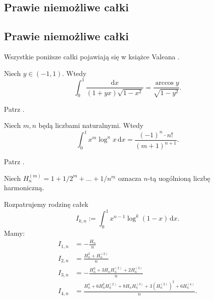 \subsection{Prawie niemożliwe całki}
\subsection{Prawie niemożliwe całki} %
Wszystkie poniższe całki pojawiają się w książce Valeana \cite{valean19}.

\begin{problem}
    \label{valean_grundpreis}%
    Niech $y \in (-1, 1)$.
    Wtedy
    \begin{equation}
        \int_0^1 \frac{\mathrm{d}x}{(1+yx) \sqrt{1-x^2}} = \frac{\arccos y}{\sqrt{1-y^2}}.
    \end{equation}
\end{problem}

\begin{solution} %
    Patrz \cite[s. 1]{valean19}. %
\end{solution} %

\begin{problem}
    \label{valean_zeugenstand}%
    Niech $m, n$ będą liczbami naturalnymi.
    Wtedy
    \begin{equation}
        \int_0^1 x^m \log^n x \,\mathrm{d} x = \frac{(-1)^n \cdot n!}{(m+1)^{n+1}}.
    \end{equation}
\end{problem}

\begin{solution} %
    Patrz \cite[s. 1]{valean19}. %
\end{solution} %

%
Niech $H_{n}^{(m)} = 1 + 1/2^m + \ldots + 1/n^m$ oznacza $n$-tą uogólnioną liczbę harmoniczną.

\begin{problem}
    \label{valean_1_3}%
    Rozpatrujemy rodzinę całek
    \begin{equation}
        I_{k,n} := \int_0^1 x^{n-1} \log^k (1-x) \,\mathrm{d} x.
    \end{equation}
    Mamy:
    \begin{align}
        I_{1,n} & = - \frac{H_n}{n} \\
        I_{2,n} & = \frac{H_n^2 + H_n^{(2)}}{n} \\
        I_{3,n} & = - \frac{H_n^3 + 3H_nH_n^{(2)} + 2H_n^{(3)}}{n} \\
        I_{4,n} & = \frac{H_n^4 + 6H_n^2 H_n^{(2)} + 8H_nH_n^{(3)} + 3(H_n^{(2)})^2 + 6H_n^{(4)}}{n}.
    \end{align}
\end{problem}

